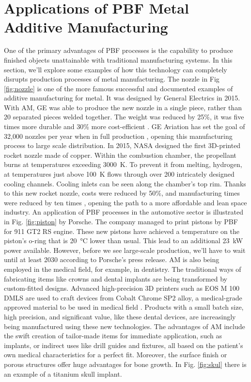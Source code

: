 
\section{Applications of PBF Metal Additive Manufacturing}
\label{sec:examplesPBF}
One of the primary advantages of PBF processes is the capability to produce finished objects unattainable with traditional manufacturing systems. In this section, we'll explore some examples of how this technology can completely disrupts production processes of metal manufacturing. The nozzle in Fig \ref{fig:nozzle} is one of the more famous successful and documented examples of additive manufacturing for metal. It was designed by General Electrics in 2015. With AM, GE was able to produce the new nozzle in a single piece, rather than 20 separated pieces welded together. The weight was reduced by 25\%, it was five times more durable and 30\% more cost-efficient \cite{amy_kover_transformation_2018}. GE Aviation has set the goal of 32,000 nozzles per year when in full production \cite{milewski_additive_2017}, opening this manufacturing process to large scale distribution. In 2015, NASA designed the first 3D-printed rocket nozzle made of copper. Within the combustion chamber, the propellant burns at temperatures exceeding \SI{3000}{\kelvin}. To prevent it from melting, hydrogen, at temperatures just above \SI{100}{\kelvin} flows through over 200 intricately designed cooling channels. Cooling inlets can be seen along the chamber's top rim. Thanks to this new rocket nozzle, costs were reduced by 50\%, and manufacturing times were reduced by ten times \cite{tracy_mcmahan_nasa_2015}, opening the path to a more affordable and lean space industry. An application of PBF processes in the automotive sector is illustrated in Fig. \ref{fig:piston} by Porsche. The company managed to print pistons by PBF for 911 GT2 RS engine. These new pistons have achieved a temperature on the piston's o-ring that is \SI{20}{\degreeCelsius} lower than usual. This lead to an additional \SI{23}{\kilo\watt} power available. However, before we see large-scale production, we'll have to wait until at least 2030 \cite{roberto_baldwin_porsches_2020} according to Porsche's press release. AM is also being employed in the medical field, for example, in dentistry. The traditional ways of fabricating items like crowns and dental implants are being transformed by custom-fitted designs. Advanced high-precision 3D printers such as EOS M 100 DMLS are used to craft devices from Cobalt Chrome SP2 alloy, a medical-grade approved material to be used in medical field \cite{milewski_additive_2017}. Products with a small batch size, high precision, and significant value, like these dental devices, are increasingly being manufactured using these new technologies. The advantages of AM include the swift creation of tailor-made items for immediate application, such as implants, or indirect uses like drill guides and fixtures, all based on the patient's own medical characteristics for a perfect fit. Moreover, the surface finish or porous structures offer huge advantages for bone growth. In Fig. \ref{fig:skul} there is an example of a titanium skull implant.
